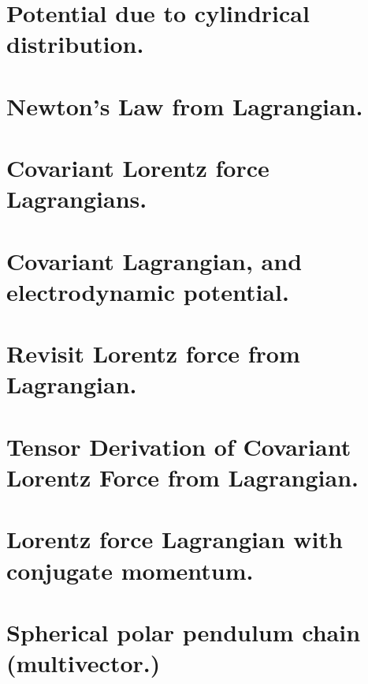 \chapter{Potential due to cylindrical distribution.}
   
\chapter{Newton's Law from Lagrangian.}
\chapter{Covariant Lorentz force Lagrangians.}
   
\chapter{Covariant Lagrangian, and electrodynamic potential.}
\chapter{Revisit Lorentz force from Lagrangian.}
\chapter{Tensor Derivation of Covariant Lorentz Force from Lagrangian.}
\chapter{Lorentz force Lagrangian with conjugate momentum.}
\chapter{Spherical polar pendulum chain (multivector.)}
   

\EndNoBibArticle
